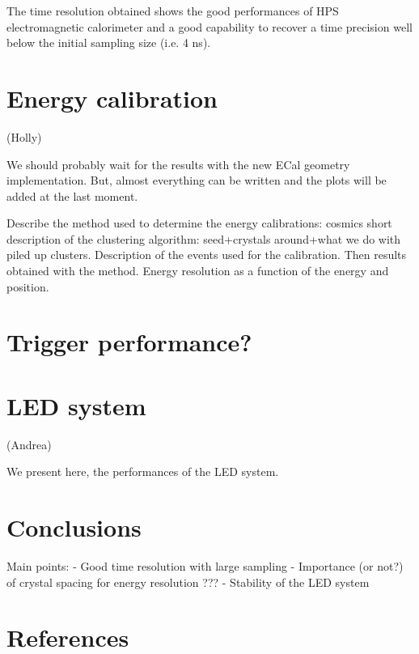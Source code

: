 \documentclass[review]{elsarticle}
\begin{document}
The time resolution obtained shows the good performances of HPS electromagnetic 
calorimeter and a good capability to recover a time
precision well below the initial sampling size (i.e. 4 ns).

\section{Energy calibration}
(Holly)

We should probably wait for the results with the new ECal geometry 
implementation. But, almost everything can be written and the plots will be 
added at the last moment.

Describe the method used to determine the energy calibrations: 
cosmics 
short description of the clustering algorithm: seed+crystals around+what we do with piled up clusters.
Description of the events used for the calibration.
Then results obtained with the method. Energy resolution as a function of the energy and position. 

\section{Trigger performance?}

\section{LED system}
(Andrea)

We present here, the performances of the LED system. 

\section{Conclusions}

Main points:
 - Good time resolution with large sampling
 - Importance (or not?) of crystal spacing for energy resolution ???
 - Stability of the LED system

\section*{References}




\end{document}
